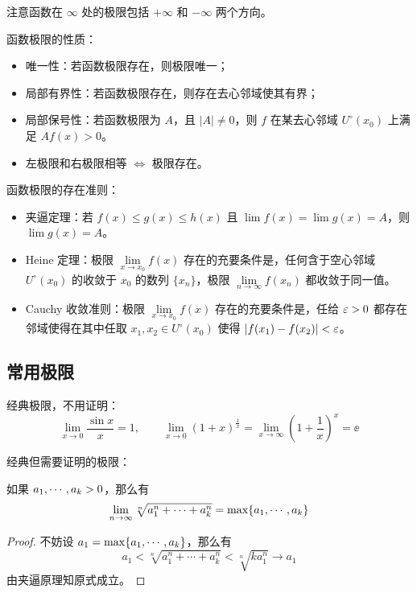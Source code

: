 \begin{note}
	注意函数在 $\infty$ 处的极限包括 $+\infty$ 和 $-\infty$ 两个方向。
\end{note}

函数极限的性质：

\begin{itemize}
	\item 唯一性：若函数极限存在，则极限唯一；
	\item 局部有界性：若函数极限存在，则存在去心邻域使其有界；
	\item 局部保号性：若函数极限为 $A$，且 $|A| \neq 0$，则 $f$ 在某去心邻域 $U^\circ(x_0)$ 上满足 $Af(x) > 0$。
	\item 左极限和右极限相等 $\Longleftrightarrow$ 极限存在。
\end{itemize}

函数极限的存在准则：

\begin{itemize}
	\item 夹逼定理：若 $f(x) \leqslant g(x) \leqslant h(x)$ 且 $\lim f(x) = \lim g(x) = A$，则 $\lim g(x) = A$。
	\item Heine 定理：极限 $\lim\limits_{x \to x_0} f(x)$ 存在的充要条件是，任何含于空心邻域 $U^\circ(x_0)$ 的收敛于 $x_0$ 的数列 $\{x_n\}$，极限 $\lim\limits_{n \to \infty} f(x_n)$ 都收敛于同一值。
	\item Cauchy 收敛准则：极限 $\lim\limits_{x \to x_0} f(x)$ 存在的充要条件是，任给 $\varepsilon > 0$ 都存在邻域使得在其中任取 $x_1, x_2 \in U^\circ(x_0)$ 使得 $|f(x_1) - f(x_2)| < \varepsilon$。
\end{itemize}

\subsection{常用极限}

经典极限，不用证明：
\[ \lim_{x \to 0} \frac{\sin x}{x} = 1, \qquad \lim_{x \to 0} (1+x)^{\frac{1}{x}} = \lim_{x \to \infty} \left(1 + \frac{1}{x}\right)^x = \ee \]

经典但需要证明的极限：

\begin{example}
	如果 $a_1,\cdots,a_k > 0$，那么有
	\[ \lim_{n \to \infty} \sqrt[n]{a_1^n + \cdots + a_k^n} = \max\{a_1,\cdots,a_k\} \]
\end{example}

\begin{proof}
	不妨设 $a_1 = \max\{a_1,\cdots,a_k\}$，那么有
	\[ a_1 < \sqrt[n]{a_1^n + \cdots + a_k^n} < \sqrt[n]{k a_1^n} \to a_1 \]
	由夹逼原理知原式成立。
\end{proof}

